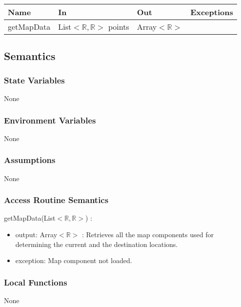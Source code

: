 \documentclass[12pt, titlepage]{article}
\begin{document}
\begin{tabular}{| l | l | l | l |}
  \hline
  \textbf{Name} & \textbf{In} & \textbf{Out} & \textbf{Exceptions}\\
  \hline
  getMapData & List$<\mathbb{R},\mathbb{R}>$ points & Array$<\mathbb{R}>$ & ~\\
  \hline
\end{tabular}

\subsection{Semantics}

\subsubsection{State Variables}

None

\subsubsection{Environment Variables}

None

\subsubsection{Assumptions}

None

\subsubsection{Access Routine Semantics}

\noindent getMapData(List$<\mathbb{R},\mathbb{R}>$) :
\begin{itemize}
\item output: Array$<\mathbb{R}>$ : Retrieves all the map components used for determining the current and the destination locations.
\item exception: Map component not loaded.
\end{itemize}

\subsubsection{Local Functions}

None

\newpage

\end{document}
